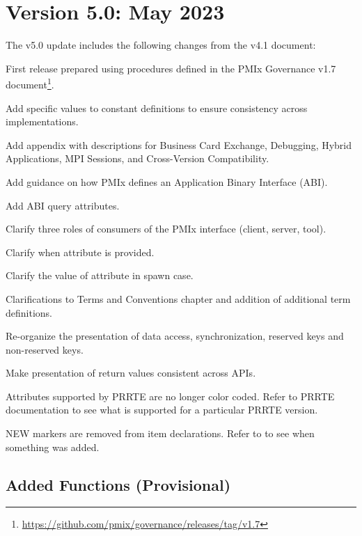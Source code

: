 \section{Version 5.0: May 2023}

The v5.0 update includes the following changes from the v4.1 document:

\begin{compactitemize}
  \item First release prepared using procedures defined in the PMIx
    Governance v1.7 document\footnote{\url{https://github.com/pmix/governance/releases/tag/v1.7}}.
  \item Add specific values to constant definitions to ensure
    consistency across implementations.
  \item Add  appendix with descriptions for Business Card
    Exchange, Debugging, Hybrid Applications, MPI Sessions, and
    Cross-Version Compatibility.
  \item Add guidance on how PMIx defines an Application Binary Interface (ABI).
  \item Add ABI query attributes.
  \item Clarify three roles of consumers of the PMIx interface (client, server, tool).
  \item Clarify when  attribute is provided.
  \item Clarify the value of  attribute in spawn case.
  \item Clarifications to Terms and Conventions chapter and addition of additional term definitions.
  \item Re-organize the presentation of data access, synchronization, reserved keys and non-reserved keys.
  \item Make presentation of return values consistent across APIs.
  \item Attributes supported by PRRTE are no longer color coded.  Refer to PRRTE documentation to see what is supported for a particular PRRTE version.
  \item NEW markers are removed from item declarations. Refer to  to see when something was added.
\end{compactitemize}

\subsection{Added Functions (Provisional)}

